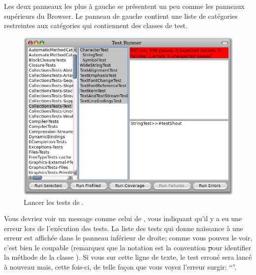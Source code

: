 \documentclass[a4paper,10pt,twoside]{book}
\begin{document}

 Les deux panneaux les plus à gauche se présentent un peu comme les
 panneaux supérieurs du Browser. Le panneau de gauche contient
 une liste de catégories restreintes aux catégories qui
 contiennent des classes de test.


\begin{figure}[hbt]
\centerline {\includegraphics[width=\textwidth]{testRunnerOnStringTest}}
\caption{Lancer les tests de .
}
\end{figure}

Vous devriez voir un message comme celui de
, vous indiquant qu'il y a eu une erreur
lors de l'exécution des tests. La liste des tests qui donne
naissance à une erreur est affichée dans le panneau inférieur de
droite; comme vous pouvez le voir, c'est bien
 le coupable
(remarquez que la notation  est la 
convention \st pour identifier la méthode de la classe ).
Si vous \clickz{} sur cette ligne de texte, le test erroné sera
lancé à nouveau mais, cette fois-ci, de telle façon que vous
voyez l'erreur surgir:
``''.
\end{document}
